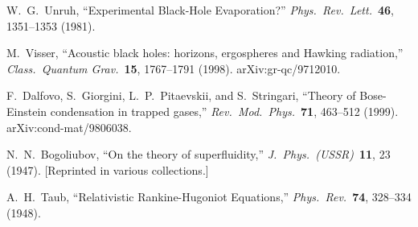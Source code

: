 W.~G.~Unruh, ``Experimental Black-Hole Evaporation?'' \emph{Phys.\ Rev.\ Lett.}\ \textbf{46}, 1351--1353 (1981).

M.~Visser, ``Acoustic black holes: horizons, ergospheres and Hawking radiation,'' \emph{Class.\ Quantum Grav.}\ \textbf{15}, 1767--1791 (1998). arXiv:gr-qc/9712010.


F.~Dalfovo, S.~Giorgini, L.~P.~Pitaevskii, and S.~Stringari, ``Theory of Bose-Einstein condensation in trapped gases,'' \emph{Rev.\ Mod.\ Phys.}\ \textbf{71}, 463--512 (1999). arXiv:cond-mat/9806038.

N.~N.~Bogoliubov, ``On the theory of superfluidity,'' \emph{J.\ Phys.\ (USSR)}\ \textbf{11}, 23 (1947). [Reprinted in various collections.]


A.~H.~Taub, ``Relativistic Rankine-Hugoniot Equations,'' \emph{Phys.\ Rev.}\ \textbf{74}, 328--334 (1948).

